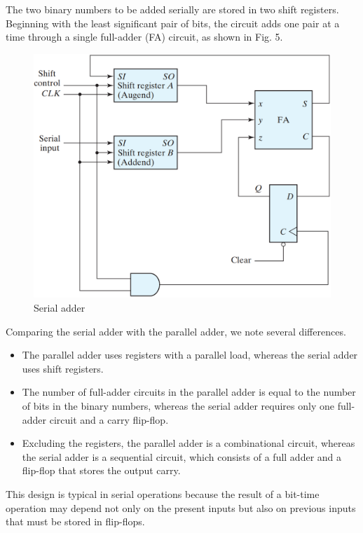 The two binary numbers to be added serially are stored in two shift registers. Beginning with the least significant pair of bits, the circuit adds one pair at a time through a single full-adder (FA) circuit, as shown in Fig. 5.
\begin{figure}[H]
  \centering
  \includegraphics[width=\linewidth]{img/fig-6.5.png}
  \caption{Serial adder}
  \label{fig:6.5}
\end{figure}
\noindent Comparing the serial adder with the parallel adder, we note several differences.
\begin{itemize}
  \item The parallel adder uses registers with a parallel load, whereas the serial adder uses shift registers.
  \item The number of full-adder circuits in the parallel adder is equal to the number of bits in the binary numbers, whereas the serial adder requires only one full-adder circuit and a carry flip-flop.
  \item Excluding the registers, the parallel adder is a combinational circuit, whereas the serial adder is a sequential circuit, which consists of a full adder and a flip-flop that stores the output carry.
\end{itemize}
This design is typical in serial operations because the result of a bit-time operation may depend not only on the present inputs but also on previous inputs that must be stored in flip-flops.

